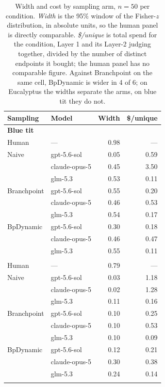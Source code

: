 \begin{table}[t]
\centering
\small
\begin{tabular}{llrr}
\toprule
Sampling & Model & Width & \$/unique \\
\midrule
\multicolumn{4}{l}{\textbf{Blue tit}} \\
\quad Human & --- & 0.98 & --- \\
\addlinespace[2pt]
\quad Naive & gpt-5.6-sol & 0.05 & 0.59 \\
 & claude-opus-5 & 0.45 & 3.50 \\
 & glm-5.3 & 0.53 & 0.11 \\
\addlinespace[2pt]
\quad Branchpoint & gpt-5.6-sol & 0.55 & 0.20 \\
 & claude-opus-5 & 0.46 & 0.53 \\
 & glm-5.3 & 0.54 & 0.17 \\
\addlinespace[2pt]
\quad BpDynamic & gpt-5.6-sol & 0.30 & 0.18 \\
 & claude-opus-5 & 0.46 & 0.47 \\
 & glm-5.3 & 0.55 & 0.11 \\
\addlinespace[2pt]
\midrule
\multicolumn{4}{l}{\textbf{Eucalyptus}} \\
\quad Human & --- & 0.79 & --- \\
\addlinespace[2pt]
\quad Naive & gpt-5.6-sol & 0.03 & 1.18 \\
 & claude-opus-5 & 0.02 & 1.28 \\
 & glm-5.3 & 0.11 & 0.16 \\
\addlinespace[2pt]
\quad Branchpoint & gpt-5.6-sol & 0.10 & 0.25 \\
 & claude-opus-5 & 0.10 & 0.53 \\
 & glm-5.3 & 0.10 & 0.09 \\
\addlinespace[2pt]
\quad BpDynamic & gpt-5.6-sol & 0.12 & 0.21 \\
 & claude-opus-5 & 0.30 & 0.38 \\
 & glm-5.3 & 0.24 & 0.14 \\
\addlinespace[2pt]
\bottomrule
\end{tabular}
\caption{Width and cost by sampling arm, $n=50$ per condition. \emph{Width} is the 95\% window of the Fisher-$z$ distribution, in absolute units, so the human panel is directly comparable. \emph{\$/unique} is total spend for the condition, Layer 1 and its Layer-2 judging together, divided by the number of distinct endpoints it bought; the human panel has no comparable figure. Against Branchpoint on the same cell, BpDynamic is wider in 4 of 6; on Eucalyptus the widths separate the arms, on blue tit they do not.}
\label{tab:coverage-spread}
\end{table}
